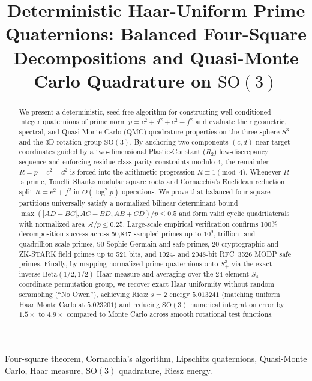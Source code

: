 \documentclass[conference]{IEEEtran}
\begin{document}
\title{Deterministic Haar-Uniform Prime Quaternions: Balanced Four-Square Decompositions and Quasi-Monte Carlo Quadrature on $\mathrm{SO}(3)$}

\author{
}

\maketitle

\begin{abstract}
We present a deterministic, seed-free algorithm for constructing well-conditioned integer quaternions of prime norm $p = c^2 + d^2 + e^2 + f^2$ and evaluate their geometric, spectral, and Quasi-Monte Carlo (QMC) quadrature properties on the three-sphere $S^3$ and the 3D rotation group $\mathrm{SO}(3)$. By anchoring two components $(c, d)$ near target coordinates guided by a two-dimensional Plastic-Constant ($R_2$) low-discrepancy sequence and enforcing residue-class parity constraints modulo $4$, the remainder $R = p - c^2 - d^2$ is forced into the arithmetic progression $R \equiv 1 \pmod 4$. Whenever $R$ is prime, Tonelli--Shanks modular square roots and Cornacchia's Euclidean reduction split $R = e^2 + f^2$ in $O(\log^2 p)$ operations. We prove that balanced four-square partitions universally satisfy a normalized bilinear determinant bound $\max(|AD-BC|, AC+BD, AB+CD)/p \le 0.5$ and form valid cyclic quadrilaterals with normalized area $\mathcal{A}/p \le 0.25$. Large-scale empirical verification confirms 100\% decomposition success across 50,847 sampled primes up to $10^9$, trillion- and quadrillion-scale primes, 90 Sophie Germain and safe primes, 20 cryptographic and ZK-STARK field primes up to 521 bits, and 1024- and 2048-bit RFC~3526 MODP safe primes. Finally, by mapping normalized prime quaternions onto $S^3_+$ via the exact inverse $\mathrm{Beta}(1/2, 1/2)$ Haar measure and averaging over the 24-element $S_4$ coordinate permutation group, we recover exact Haar uniformity without random scrambling (``No Owen''), achieving Riesz $s=2$ energy $5.013241$ (matching uniform Haar Monte Carlo at $5.023201$) and reducing $\mathrm{SO}(3)$ numerical integration error by $1.5\times$ to $4.9\times$ compared to Monte Carlo across smooth rotational test functions.
\end{abstract}

\begin{IEEEkeywords}
Four-square theorem, Cornacchia's algorithm, Lipschitz quaternions, Quasi-Monte Carlo, Haar measure, $\mathrm{SO}(3)$ quadrature, Riesz energy.
\end{IEEEkeywords}
\end{document}

